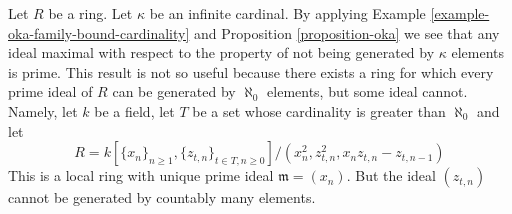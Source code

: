 \begin{remark}
\label{remark-cohen-bound-cardinality}
Let $R$ be a ring. Let $\kappa$ be an infinite cardinal.
By applying
Example \ref{example-oka-family-bound-cardinality} and
Proposition \ref{proposition-oka}
we see that any ideal maximal with respect to the property of not being
generated by $\kappa$ elements is prime. This result is not so
useful because there exists a ring for which every prime ideal
of $R$ can be generated by $\aleph_0$ elements, but some
ideal cannot. Namely, let $k$ be a field, let $T$ be a set whose
cardinality is greater than $\aleph_0$ and let
$$
R = k[\{x_n\}_{n \geq 1}, \{z_{t, n}\}_{t \in T, n \geq 0}]/
(x_n^2, z_{t, n}^2, x_n z_{t, n} - z_{t, n - 1})
$$
This is a local ring with unique prime ideal
$\mathfrak m = (x_n)$. But the ideal $(z_{t, n})$ cannot
be generated by countably many elements.
\end{remark}